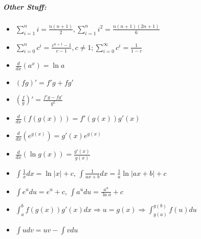 \documentclass[landscape,10pt]{article}
\begin{document}
\begin{multicols}{4}
    \subparagraph*{Other Stuff:}
    \begin{itemize}
        \item[] \(\sum\limits_{i=1}^{n}i = \frac{n(n+1)}{2},\sum\limits_{i=1}^{n}i^2 = \frac{n(n+1)(2n+1)}{6}\)
        \item[] \(\sum\limits_{i=0}^{n}c^i = \frac{c^{n+1}-1}{c-1}, c \neq 1; \sum\limits_{i=0}^{\infty}c^i = \frac{1}{1-c}\)
        \item[] \(\frac{d}{dx}(a^x) = \ln a\)
        \item[] \((fg)' = f'g + fg'\)
        \item[] \(\left(\frac{f}{g}\right)' = \frac{f'g-fg'}{g^2}\)
        \item[] \(\frac{d}{dx}(f(g(x)))=f'(g(x))g'(x)\)
        \item[] \(\frac{d}{dx}(e^{g(x)})= g'(x)e^{g(x)}\)
        \item[] \(\frac{d}{dx}(\ln g(x)) = \frac{g'(x)}{g(x)}\)
        \item[] \(\int \frac{1}{x}dx = \ln |x| + c\), \(\int \frac{1}{ax+b}dx=\frac{1}{a}\ln |ax+b|+c\)
        \item[] \(\int e^u du = e^u + c\), \(\int {a^u}du = \frac{a^u}{\ln a} + c\)
        \item[] \(\int_{a}^{b}{f(g(x))g'(x)}dx \Rightarrow u=g(x) \Rightarrow \int_{g(a)}^{g(b)}f(u)du\)
        \item[] \(\int udv = uv - \int vdu\)
    \end{itemize}

    


    \end{multicols}
\end{document}
